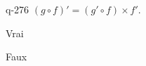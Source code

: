 \begin{truefalse}{q-276}
$(g \circ f)' = (g' \circ f )\times f'$.
\item* Vrai
\item Faux
\end{truefalse}

